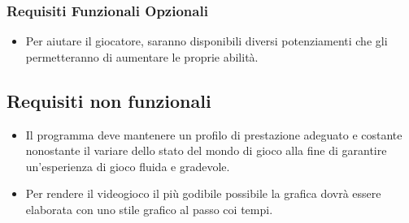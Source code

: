 \documentclass[a4paper,12pt]{report}
\begin{document}
\subsubsection{Requisiti Funzionali Opzionali}
\begin{itemize}
	\item Per aiutare il giocatore, saranno disponibili diversi potenziamenti che gli permetteranno di aumentare le proprie abilità.
\end{itemize}
\subsection*{Requisiti non funzionali}
\begin{itemize}
	\item Il programma deve mantenere un profilo di prestazione adeguato e costante nonostante il variare dello stato del mondo di gioco alla fine di garantire un’esperienza di gioco fluida e gradevole.
	\item Per rendere il videogioco il più godibile possibile la grafica dovrà essere elaborata con uno stile grafico al passo coi tempi.
\end{itemize}
\newpage
\end{document}
